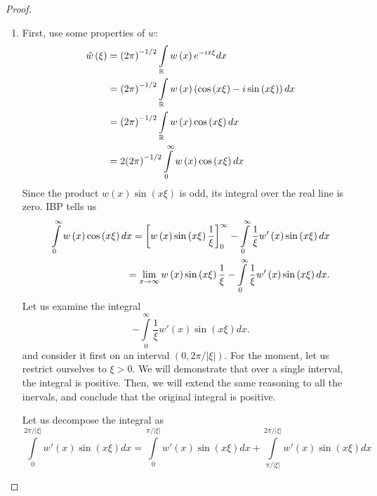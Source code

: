 \documentclass[letterpaper,twoside,11pt]{article}
\theoremstyle{mystyle}
\begin{document}
\begin{proof}
  \begin{enumerate}
    \item First, use some properties of $w$: 
    \begin{align*}
      \hat w\left( \xi  \right) &= {\left( {2\pi } \right)^{ - 1/2}}\int\limits_\mathbb{R} {w\left( x \right){e^{ - ix\xi }}dx}  \hfill \\
       &= {\left( {2\pi } \right)^{ - 1/2}}\int\limits_\mathbb{R} {w\left( x \right)\left( {\cos \left( {x\xi } \right) - i\sin \left( {x\xi } \right)} \right)dx}  \hfill \\
       &= {\left( {2\pi } \right)^{ - 1/2}}\int\limits_\mathbb{R} {w\left( x \right)\cos \left( {x\xi } \right)dx}  \hfill \\
       &= 2{\left( {2\pi } \right)^{ - 1/2}}\int\limits_0^\infty  {w\left( x \right)\cos \left( {x\xi } \right)dx}  
    \end{align*}
    Since the product $w(x)\sin(x\xi)$ is odd, its integral over the real line is zero. IBP tells us 
    \begin{align*}
        \int\limits_0^\infty  {w\left( x \right)\cos \left( {x\xi } \right)dx}  = \left[ {w\left( x \right)\sin \left( {x\xi } \right)\frac{1}{\xi }} \right]_0^\infty  - \int\limits_0^\infty  {\frac{1}{\xi }w'\left( x \right)\sin \left( {x\xi } \right)dx}  \hfill \\
         = \mathop {\lim }\limits_{x \to \infty } w\left( x \right)\sin \left( {x\xi } \right)\frac{1}{\xi } - \int\limits_0^\infty  {\frac{1}{\xi }w'\left( x \right)\sin \left( {x\xi } \right)dx}  .
    \end{align*}
    Let us examine the integral 
    \[ - \int\limits_0^\infty  {\frac{1}{\xi }w'\left( x \right)\sin \left( {x\xi } \right)dx} .\]
    and consider it first on an interval $(0, 2\pi / |\xi|)$. For the moment, let us restrict ourselves to $\xi > 0$. We will demonstrate that over a single interval, the integral is positive. Then, we will extend the same reasoning to all the inervals, and conclude that the original integral is positive. 

    Let us decompose the integral as
    \[\int\limits_0^{2\pi /\left| \xi  \right|} {w'\left( x \right)\sin \left( {x\xi } \right)dx}  = \int\limits_0^{\pi /\left| \xi  \right|} {w'\left( x \right)\sin \left( {x\xi } \right)dx}  + \int\limits_{\pi /\left| \xi  \right|}^{2\pi /\left| \xi  \right|} {w'\left( x \right)\sin \left( {x\xi } \right)dx} \]


  \end{enumerate}
\end{proof}
\end{document}
